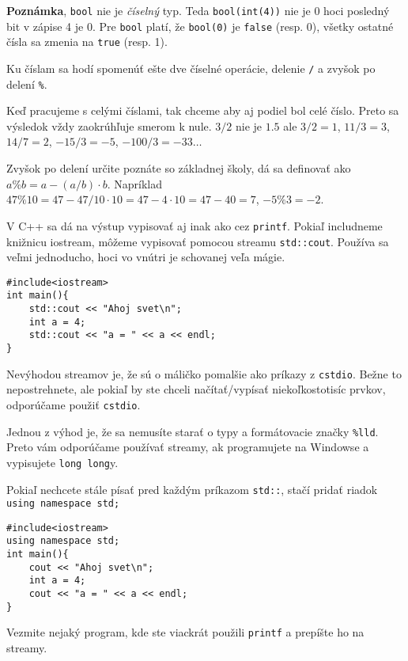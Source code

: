 \medskip

\textbf{Poznámka}, \verb!bool! nie je \textit{číselný} typ. Teda \verb!bool(int(4))! nie
je 0 hoci posledný bit v zápise 4 je 0.  Pre \verb!bool! platí, že
\verb!bool(0)! je \verb!false! (resp. 0), všetky ostatné čísla sa zmenia na
\verb!true! (resp. 1).

\medskip

Ku číslam sa hodí spomenúť ešte dve číselné operácie, delenie \verb'/' a zvyšok
po delení \verb'%'. 

Keď pracujeme s celými číslami, tak chceme aby aj podiel bol celé číslo.  Preto
sa výsledok vždy zaokrúhľuje smerom k nule.  $3/2$ nie je $1.5$ ale $3/2 = 1$,
$11/3 = 3$, $14/7 = 2$, $-15/3 = -5$, $-100/3 = -33\dots$

Zvyšok po delení určite poznáte so základnej školy, dá sa definovať ako $a \% b
= a - (a/b)\cdot b$.
Napríklad $47 \% 10 = 47 - 47/10\cdot 10 = 47 - 4\cdot 10 = 47 - 40 = 7$,
$-5 \% 3 = -2$.


V C++ sa dá na výstup vypisovať aj inak ako cez \verb!printf!. Pokiaľ
includneme knižnicu iostream, môžeme vypisovať pomocou streamu
\verb!std::cout!. Používa sa veľmi jednoducho, hoci vo vnútri je schovanej veľa
mágie.

\begin{lstlisting}
#include<iostream>
int main(){
    std::cout << "Ahoj svet\n";
    int a = 4;
    std::cout << "a = " << a << endl;
}
\end{lstlisting}

Nevýhodou streamov je, že sú o máličko pomalšie ako príkazy z \verb!cstdio!. Bežne
to nepostrehnete, ale pokiaľ by ste chceli načítať/vypísať niekoľkostotisíc
prvkov, odporúčame použiť \verb!cstdio!.

Jednou z výhod je, že sa nemusíte starať o typy a formátovacie značky
\verb"%lld". Preto vám odporúčame používať streamy, ak programujete na Windowse
a vypisujete \verb!long long!y.

Pokiaľ nechcete stále písať pred každým príkazom \verb!std::!, stačí pridať
riadok \verb!using namespace std;!

\begin{lstlisting}
#include<iostream>
using namespace std;
int main(){
    cout << "Ahoj svet\n";
    int a = 4;
    cout << "a = " << a << endl;
}
\end{lstlisting}

\cvicenie Vezmite nejaký program, kde ste viackrát použili \verb!printf! a
prepíšte ho na streamy.
\fakeriesenie

